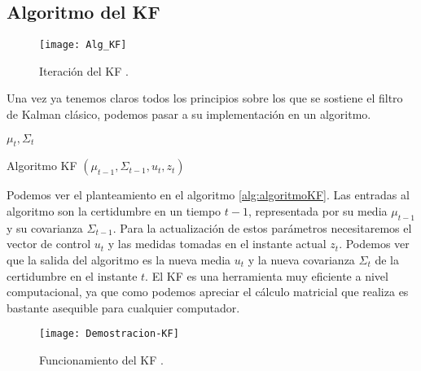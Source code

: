 \subsection{Algoritmo del KF}

\begin{figure}[ht!]
\centering
\texttt{[image: Alg\_KF]}
\caption{Iteración del KF \cite{leonardo_navegacion_2011}\cite{AnIntroductionToTheKalmanFilter}.} \label{Iteracion_KF}
\end{figure}

Una vez ya tenemos claros todos los principios sobre los que se sostiene el filtro de Kalman clásico, podemos pasar a su implementación en un algoritmo.
\begin{algorithm}
\begin{algorithmic} [1]
\RETURN $\mu_{t},\Sigma_{t}$
\end{algorithmic}
\caption{Algoritmo KF \cite{thrun_probabilistic_2005} $(\mu_{t-1},\Sigma_{t-1},u_{t},z_{t})$}\label{alg:algoritmoKF}
\end{algorithm}
Podemos ver el planteamiento en el algoritmo \ref{alg:algoritmoKF}.
Las entradas al algoritmo son la certidumbre en un tiempo $t-1$, representada por su media $\mu_{t-1}$ y su covarianza $\Sigma_{t-1}$.
Para la actualización de estos parámetros necesitaremos el vector de control $u_t$ y las medidas tomadas en el instante actual $z_t$.
Podemos ver que la salida del algoritmo es la nueva media $u_t$ y la nueva covarianza $\Sigma_t$ de la certidumbre en el instante $t$. El \ac{KF} es una herramienta muy eficiente a nivel computacional, ya que como podemos apreciar el cálculo matricial que realiza es bastante asequible para cualquier computador.

\begin{figure}[t!]
\centering
\texttt{[image: Demostracion-KF]}
\caption{Funcionamiento del KF \cite{thrun_probabilistic_2005}.} \label{Demostracion_KF}
\end{figure}

